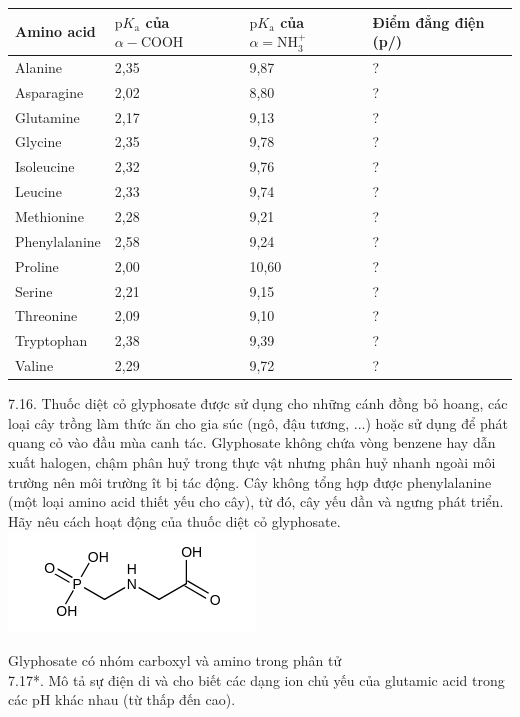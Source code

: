 \documentclass[10pt]{article}
\begin{document}
\begin{center}
\begin{tabular}{|l|l|l|l|}
\hline
Amino acid & $\mathrm{p} K_{\mathrm{a}}$ của $\alpha-\mathrm{COOH}$ & $\mathrm{p} K_{\mathrm{a}}$ của $\alpha=\mathrm{NH}_{3}^{+}$ & Điểm đẳng điện (p/) \\
\hline
Alanine & 2,35 & 9,87 & ? \\
\hline
Asparagine & 2,02 & 8,80 & ? \\
\hline
Glutamine & 2,17 & 9,13 & ? \\
\hline
Glycine & 2,35 & 9,78 & ? \\
\hline
Isoleucine & 2,32 & 9,76 & ? \\
\hline
Leucine & 2,33 & 9,74 & ? \\
\hline
Methionine & 2,28 & 9,21 & ? \\
\hline
Phenylalanine & 2,58 & 9,24 & ? \\
\hline
Proline & 2,00 & 10,60 & ? \\
\hline
Serine & 2,21 & 9,15 & ? \\
\hline
Threonine & 2,09 & 9,10 & ? \\
\hline
Tryptophan & 2,38 & 9,39 & ? \\
\hline
Valine & 2,29 & 9,72 & ? \\
\hline
\end{tabular}
\end{center}

7.16. Thuốc diệt cỏ glyphosate được sử dụng cho những cánh đồng bỏ hoang, các loại cây trồng làm thức ăn cho gia súc (ngô, đậu tương, ...) hoặc sử dụng để phát quang cỏ vào đầu mùa canh tác. Glyphosate không chứa vòng benzene hay dẫn xuất halogen, chậm phân huỷ trong thực vật nhưng phân huỷ nhanh ngoài môi trường nên môi trường ît bị tác động. Cây không tổng hợp được phenylalanine (một loại amino acid thiết yếu cho cây), từ đó, cây yếu dần và ngưng phát triển. Hãy nêu cách hoạt động của thuốc diệt cỏ glyphosate.\\
\includegraphics{smile-3504250df7fd3e2e702f4ef4ee65b5f70f21ad37}

Glyphosate có nhóm carboxyl và amino trong phân tử\\
7.17*. Mô tả sự điện di và cho biết các dạng ion chủ yếu của glutamic acid trong các pH khác nhau (từ thấp đến cao).
\end{document}
